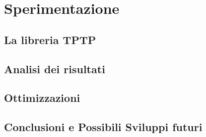 \documentclass[./main.tex]{subfiles}
\begin{document}
\chapter{Sperimentazione}
\section{La libreria TPTP}
\section{Analisi dei risultati}
\section{Ottimizzazioni}
\section{Conclusioni e Possibili Sviluppi futuri}
\end{document}

